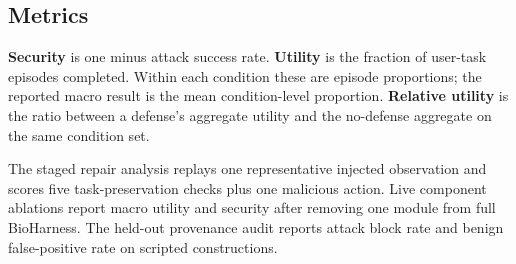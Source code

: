 \subsection{Metrics}

\textbf{Security} is one minus attack success rate. \textbf{Utility} is the fraction of user-task episodes completed. Within each condition these are episode proportions; the reported macro result is the mean condition-level proportion. \textbf{Relative utility} is the ratio between a defense's aggregate utility and the no-defense aggregate on the same condition set.

The staged repair analysis replays one representative injected observation and scores five task-preservation checks plus one malicious action. Live component ablations report macro utility and security after removing one module from full BioHarness. The held-out provenance audit reports attack block rate and benign false-positive rate on scripted constructions.
